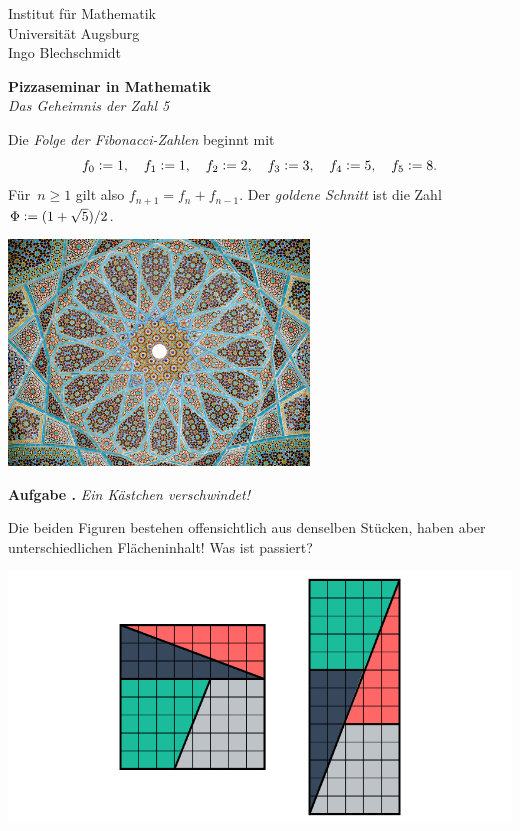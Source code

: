 \documentclass[a4paper,ngerman,twoside]{scrartcl}
\newcommand{\defeq}{\vcentcolon=}
\newlength{\aufgabenskip}
\newcounter{aufgabennummer}
\newenvironment{aufgabe}[1]{
  \addtocounter{aufgabennummer}{1}
  \textbf{Aufgabe \theaufgabennummer.} \emph{#1} \par
}{\vspace{\aufgabenskip}}
\begin{document}
\thispagestyle{empty}
Institut für Mathematik \\
Universität Augsburg \\
Ingo Blechschmidt

\begin{center}
  \textbf{Pizzaseminar in Mathematik} \\
  \emph{Das Geheimnis der Zahl 5}
\end{center}
\vspace{1em}

Die \emph{Folge der Fibonacci-Zahlen} beginnt mit
\[
  f_0 \defeq 1, \quad
  f_1 \defeq 1, \quad
  f_2 \defeq 2, \quad
  f_3 \defeq 3, \quad
  f_4 \defeq 5, \quad
  f_5 \defeq 8.
\]
Für~$n \geq 1$ gilt also $f_{n+1} = f_n + f_{n-1}$. Der \emph{goldene Schnitt}
ist die Zahl~$\Phi \defeq (1+\sqrt{5})/2$.

\begin{center}\includegraphics[width=0.60\textwidth]{hafez-tomb}\end{center}

\begin{aufgabe}{Ein Kästchen verschwindet!}
Die beiden Figuren bestehen offensichtlich aus denselben Stücken, haben
aber unterschiedlichen Flächeninhalt! Was ist passiert?
\begin{center}
  \includegraphics[scale=0.3]{ein-kaestchen-verschwindet}
\end{center}
\end{aufgabe}
\end{document}

